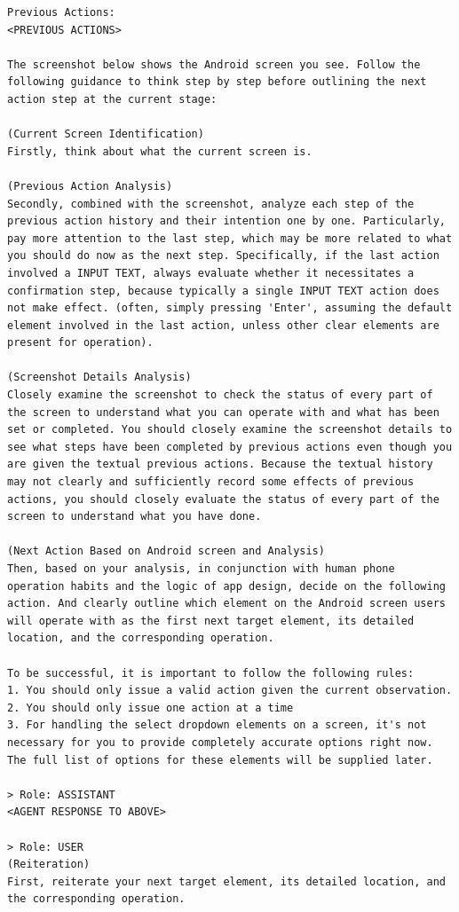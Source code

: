 \documentclass{article}
\begin{document}
\begin{appendices}
\begin{lstlisting}[basicstyle=\ttfamily\footnotesize,breaklines=true,language={}, style=mystyle, keywordstyle=\color{black}]
Previous Actions:
<PREVIOUS ACTIONS>

The screenshot below shows the Android screen you see. Follow the following guidance to think step by step before outlining the next action step at the current stage:

(Current Screen Identification)
Firstly, think about what the current screen is.

(Previous Action Analysis)
Secondly, combined with the screenshot, analyze each step of the previous action history and their intention one by one. Particularly, pay more attention to the last step, which may be more related to what you should do now as the next step. Specifically, if the last action involved a INPUT TEXT, always evaluate whether it necessitates a confirmation step, because typically a single INPUT TEXT action does not make effect. (often, simply pressing 'Enter', assuming the default element involved in the last action, unless other clear elements are present for operation).

(Screenshot Details Analysis)
Closely examine the screenshot to check the status of every part of the screen to understand what you can operate with and what has been set or completed. You should closely examine the screenshot details to see what steps have been completed by previous actions even though you are given the textual previous actions. Because the textual history may not clearly and sufficiently record some effects of previous actions, you should closely evaluate the status of every part of the screen to understand what you have done.

(Next Action Based on Android screen and Analysis)
Then, based on your analysis, in conjunction with human phone operation habits and the logic of app design, decide on the following action. And clearly outline which element on the Android screen users will operate with as the first next target element, its detailed location, and the corresponding operation.

To be successful, it is important to follow the following rules:
1. You should only issue a valid action given the current observation.
2. You should only issue one action at a time
3. For handling the select dropdown elements on a screen, it's not necessary for you to provide completely accurate options right now. The full list of options for these elements will be supplied later.

> Role: ASSISTANT
<AGENT RESPONSE TO ABOVE>

> Role: USER
(Reiteration)
First, reiterate your next target element, its detailed location, and the corresponding operation.


\end{lstlisting}
\end{appendices}
\end{document}
